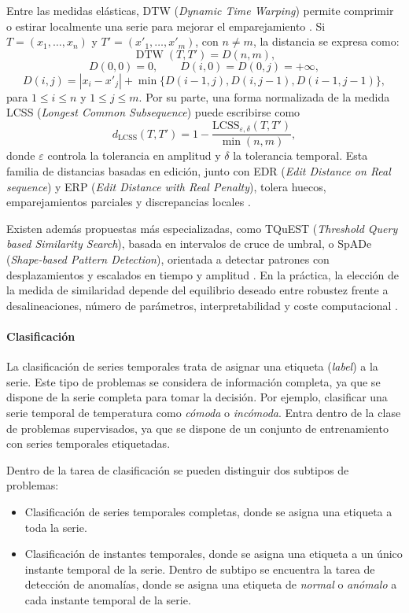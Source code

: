 \documentclass[12pt]{report} %
\begin{document}
Entre las medidas elásticas, DTW (\textit{Dynamic Time Warping}) permite comprimir o estirar localmente una serie para mejorar el emparejamiento \cite{BerndtClifford1994}. Si $T = (x_1, \ldots, x_n)$ y $T' = (x'_1, \ldots, x'_m)$, con $n \neq m$, la distancia se expresa como:
$$
    \operatorname{DTW}(T, T') = D(n,m),
$$
$$
    D(0,0)=0, \qquad D(i,0)=D(0,j)=+\infty,
$$
$$
    D(i,j) = |x_i - x'_j| + \min\{D(i-1,j), D(i,j-1), D(i-1,j-1)\},
$$
para $1 \leq i \leq n$ y $1 \leq j \leq m$. Por su parte, una forma normalizada de la medida LCSS (\textit{Longest Common Subsequence}) puede escribirse como
$$
    d_{\mathrm{LCSS}}(T, T') = 1 - \frac{\mathrm{LCSS}_{\varepsilon,\delta}(T, T')}{\min(n,m)},
$$
donde $\varepsilon$ controla la tolerancia en amplitud y $\delta$ la tolerancia temporal. Esta familia de distancias basadas en edición, junto con EDR (\textit{Edit Distance on Real sequence}) y ERP (\textit{Edit Distance with Real Penalty}), tolera huecos, emparejamientos parciales y discrepancias locales \cite{Ding2008,ChenOzsuOria2005,ChenNg2004,Morse2007}.

Existen además propuestas más especializadas, como TQuEST (\textit{Threshold Query based Similarity Search}), basada en intervalos de cruce de umbral, o SpADe (\textit{Shape-based Pattern Detection}), orientada a detectar patrones con desplazamientos y escalados en tiempo y amplitud \cite{Assfalg2006,Chen2007SpADe}. En la práctica, la elección de la medida de similaridad depende del equilibrio deseado entre robustez frente a desalineaciones, número de parámetros, interpretabilidad y coste computacional \cite{Ding2008}.

\paragraph{Clasificación}\mbox{}

La clasificación de series temporales trata de asignar una etiqueta (\textit{label}) a la serie. Este tipo de problemas se considera de información completa, ya que se dispone de la serie completa para tomar la decisión. Por ejemplo, clasificar una serie temporal de temperatura como \textit{cómoda} o \textit{incómoda}. Entra dentro de la clase de problemas supervisados, ya que se dispone de un conjunto de entrenamiento con series temporales etiquetadas.

Dentro de la tarea de clasificación se pueden distinguir dos subtipos de problemas:
\begin{itemize}
    \item Clasificación de series temporales completas, donde se asigna una etiqueta a toda la serie.
    \item Clasificación de instantes temporales, donde se asigna una etiqueta a un único instante temporal de la serie. Dentro de subtipo se encuentra la tarea de detección de anomalías, donde se asigna una etiqueta de \textit{normal} o \textit{anómalo} a cada instante temporal de la serie.
\end{itemize}
\end{document}
